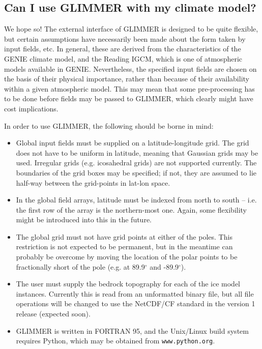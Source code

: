 \documentclass[11pt]{article}
\begin{document}
\subsection{Can I use GLIMMER with my climate model?}

We hope so! The external interface of GLIMMER is designed to be quite
flexible, but certain assumptions have necessarily been made about the form
taken by input fields, etc. In general, these are derived from the
characteristics of the GENIE climate model, and the Reading IGCM, which is one
of atmospheric models available in GENIE. Nevertheless, the specified input
fields are chosen on the basis of their physical importance, rather than
because of their availability within a given atmospheric model. This may mean
that some pre-processing has to be done before fields may be passed to
GLIMMER, which clearly might have cost implications.

In order to use GLIMMER, the following should be borne in mind:

\begin{itemize}
\item Global input fields must be supplied on a latitude-longitude
  grid. The grid does not have to be uniform in latitude, meaning that
  Gaussian grids may be used. Irregular grids (e.g. icosahedral grids) are not
  supported currently. The boundaries of the grid boxes may be specified; if
  not, they are assumed to lie half-way between the grid-points in lat-lon space.
\item In the global field arrays, latitude must be indexed from north to south
  -- i.e. the first row of the array is the northern-most one. Again, some
  flexibility might be introduced into this in the future.
\item The global grid must not have grid points at either of the
  poles. This restriction is not expected to be permanent, but in the meantime
  can probably be overcome by moving the location of the polar points to be
  fractionally short of the pole (e.g. at 89.9$^{\circ}$ and -89.9$^{\circ}$).
\item The user must supply the bedrock topography for each of the ice model
  instances. Currently this is read from an unformatted binary file, but all
  file operations will be changed to use the NetCDF/CF standard in the
  version 1 release (expected soon).
\item GLIMMER is written in FORTRAN 95, and the Unix/Linux build system
  requires Python, which may be obtained from \texttt{www.python.org}. 
\end{itemize}
\end{document}
